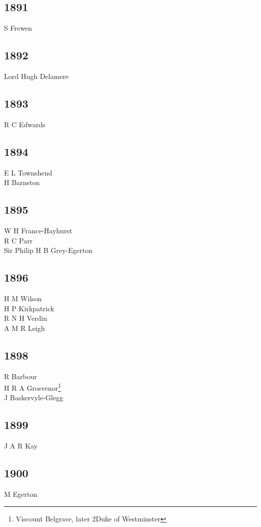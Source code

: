 \begin{multicols}{3}
  \subsection*{1891}
  S Frewen \\
  \subsection*{1892}
  Lord Hugh Delamere \\
  \subsection*{1893}
  R C Edwards \\
  \subsection*{1894}
  E L Townshend \\
  H Barnston \\
  \subsection*{1895}
  W H France-Hayhurst \\
  R C Parr \\
  Sir Philip H B Grey-Egerton \\
  \subsection*{1896}
  H M Wilson \\
  H P Kirkpatrick \\
  R N H Verdin \\
  A M R Leigh \\
  \subsection*{1898}
  R Barbour \\
  H R A Grosvenor\footnote{Viscount Belgrave, later 2\nd Duke of Westminster} \\
  J Baskervyle-Glegg \\
  \subsection*{1899}
  J A R Kay \\
  \subsection*{1900}
  M Egerton \\

\end{multicols}
